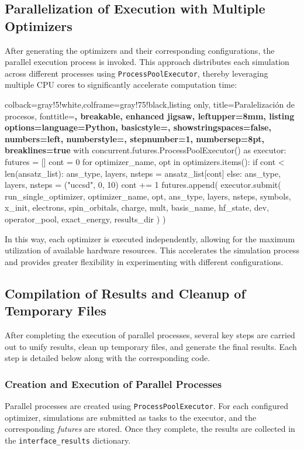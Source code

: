\subsection{Parallelization of Execution with Multiple Optimizers}
After generating the optimizers and their corresponding configurations, the parallel execution process is invoked. This approach distributes each simulation across different processes using \texttt{ProcessPoolExecutor}, thereby leveraging multiple CPU cores to significantly accelerate computation time:


\begin{tcblisting}{colback=gray!5!white,colframe=gray!75!black,listing only,
    title=Paralelización de procesos, fonttitle=\bfseries, breakable, enhanced jigsaw, leftupper=8mm,
    listing options={language=Python, basicstyle=\ttfamily\small,
    showstringspaces=false, numbers=left, numberstyle=\footnotesize,
    stepnumber=1, numbersep=8pt, breaklines=true}}
with concurrent.futures.ProcessPoolExecutor() as executor:
    futures = []
    cont = 0
    for optimizer_name, opt in optimizers.items():
        if cont < len(ansatz_list):
            ans_type, layers, nsteps = ansatz_list[cont]
        else:
            ans_type, layers, nsteps = ("uccsd", 0, 10)
        cont += 1
        futures.append(
            executor.submit(
                run_single_optimizer,
                optimizer_name, opt, ans_type, layers, nsteps, symbols, x_init, electrons, spin_orbitals, charge,
                mult, basis_name, hf_state, dev, operator_pool, exact_energy, results_dir
            )
        )
\end{tcblisting}

In this way, each optimizer is executed independently, allowing for the maximum utilization of available hardware resources. This accelerates the simulation process and provides greater flexibility in experimenting with different configurations.

\subsection{Compilation of Results and Cleanup of Temporary Files}
After completing the execution of parallel processes, several key steps are carried out to unify results, clean up temporary files, and generate the final results. Each step is detailed below along with the corresponding code.

\subsubsection{Creation and Execution of Parallel Processes}
Parallel processes are created using \texttt{ProcessPoolExecutor}. For each configured optimizer, simulations are submitted as tasks to the executor, and the corresponding \emph{futures} are stored. Once they complete, the results are collected in the \texttt{interface\_results} dictionary.

